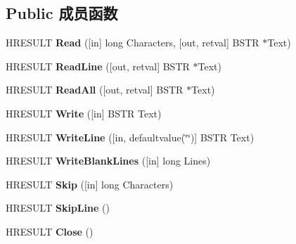 \subsection*{Public 成员函数}
\begin{DoxyCompactItemize}
\item 
\mbox{\label{interface_scripting_1_1_i_text_stream_a3ca62ac6c1f11a067fda4f0ae3c8be3a}} 
H\+R\+E\+S\+U\+LT {\bfseries Read} (\mbox{[}in\mbox{]} long Characters, \mbox{[}out, retval\mbox{]} B\+S\+TR $\ast$Text)
\item 
\mbox{\label{interface_scripting_1_1_i_text_stream_a81e4755b9ef82699d282711c8e2e94e9}} 
H\+R\+E\+S\+U\+LT {\bfseries Read\+Line} (\mbox{[}out, retval\mbox{]} B\+S\+TR $\ast$Text)
\item 
\mbox{\label{interface_scripting_1_1_i_text_stream_a628a31840e41fef242ee090d3e86cadd}} 
H\+R\+E\+S\+U\+LT {\bfseries Read\+All} (\mbox{[}out, retval\mbox{]} B\+S\+TR $\ast$Text)
\item 
\mbox{\label{interface_scripting_1_1_i_text_stream_ab72c777fd3c0d418f350db15e36b95e1}} 
H\+R\+E\+S\+U\+LT {\bfseries Write} (\mbox{[}in\mbox{]} B\+S\+TR Text)
\item 
\mbox{\label{interface_scripting_1_1_i_text_stream_afe911877f7b4bc1a22e5668d7866f125}} 
H\+R\+E\+S\+U\+LT {\bfseries Write\+Line} (\mbox{[}in, defaultvalue(\char`\"{}\char`\"{})\mbox{]} B\+S\+TR Text)
\item 
\mbox{\label{interface_scripting_1_1_i_text_stream_ac228e38ddcb593e07e9712c305759d4a}} 
H\+R\+E\+S\+U\+LT {\bfseries Write\+Blank\+Lines} (\mbox{[}in\mbox{]} long Lines)
\item 
\mbox{\label{interface_scripting_1_1_i_text_stream_a45133079cc002f34223994c3e9e9c1f7}} 
H\+R\+E\+S\+U\+LT {\bfseries Skip} (\mbox{[}in\mbox{]} long Characters)
\item 
\mbox{\label{interface_scripting_1_1_i_text_stream_a95bdad4733fad343d49acd9ebe4554e7}} 
H\+R\+E\+S\+U\+LT {\bfseries Skip\+Line} ()
\item 
\mbox{\label{interface_scripting_1_1_i_text_stream_af98916aadbfab06a0d945012be9d45c6}} 
H\+R\+E\+S\+U\+LT {\bfseries Close} ()
\end{DoxyCompactItemize}
